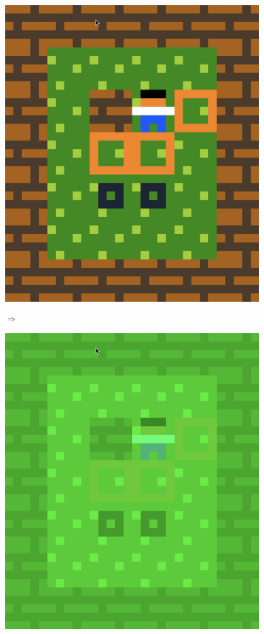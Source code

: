 \begin{figure}[!htbp]
\begin{minipage}[t]{0.2\textwidth}
\includegraphics[width=\textwidth]{figures/maxii0.png} \hfill \\
\end{minipage}
$\Longrightarrow$
\begin{minipage}[t]{0.2\textwidth}
\includegraphics[width=\textwidth]{figures/maxii1_green.png} \hfill \\

\end{minipage}
\end{figure}
